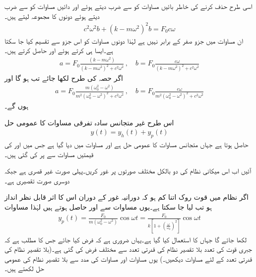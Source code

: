 اسی طرح  حذف کرنے کی خاطر بائیں مساوات کو  سے ضرب دیتے ہوئے اور دائیں مساوات کو  سے ضرب دیتے ہوئے دونوں کا مجموعہ لیتے ہیں۔
\begin{align*}
c^2\omega^2 b+(k-m\omega^2)^2b=F_0c\omega
\end{align*}
ان مساوات میں جزو  صفر کے برابر نہیں ہے لہٰذا دونوں مساوات کو اس جزو سے تقسیم کیا جا سکتا ہے۔ایسا ہی کرتے ہوئے  اور  حاصل کرتے ہیں۔
\begin{align*}
a=F_0\frac{(k-m\omega^2)}{(k-m\omega^2)^2+c^2\omega^2}\, , \quad b=F_0\frac{c\omega}{(k-m\omega^2)^2+c^2\omega^2}
\end{align*}
اگر حصہ  کی طرح  لکھا جائے تب  ہو گا اور 
\begin{align}\label{مساوات_سادہ_دو_نا_معلوم_عددی_سر_الف}
a=F_0\frac{m(\omega_0^2-\omega^2)}{m^2(\omega_0^2-\omega^2)^2+c^2\omega^2}\, , \quad b=F_0\frac{c\omega}{m^2(\omega_0^2-\omega^2)^2+c^2\omega^2}
\end{align}
ہوں گے۔

اس طرح غیر متجانس سادہ تفرقی مساوات  کا عمومی حل
\begin{align}\label{مساوات_سادہ_دو_نا_معلوم_عددی_سر_ب}
y(t)=y_h(t)+y_p(t)
\end{align}
حاصل ہوتا ہے جہاں  متجانس مساوات  کا عمومی حل ہے اور  مساوات  میں دیا گیا ہے جس میں  اور  کی قیمتیں مساوات  سے پر کی گئی ہیں۔

آئیں اب اس میکانی نظام کی دو بالکل مختلف صورتوں پر غور کریں۔پہلی صورت  غیر قصری ہے جبکہ دوسری صورت  تقصیری ہے۔

اگر نظام میں قوت روک اتنا کم ہو کہ دورانیہ غور کے دوران اس کا اثر قابل نظر انداز ہو تب  لیا جا سکتا ہے۔یوں مساوات  سے  اور  حاصل ہوتے ہیں لہٰذا مساوات 
\begin{align}\label{مساوات_سادہ_دو_بلا_تقصیر_حل_الف}
y_p(t)=\frac{F_0}{m(\omega_0^2-\omega^2)}\cos \omega t=\frac{F_0}{k[1+\left(\frac{\omega}{\omega_0}\right)^2]}\cos \omega t
\end{align}
لکھا جائے گا جہاں  کا استعمال کیا گیا ہے۔یہاں ضروری ہے کہ  فرض کیا جائے جس کا مطلب ہے کہ جبری قوت کی تعدد  بلا تقصیر نظام کی قدرتی تعدد  سے مختلف فرض کی گئی ہے۔(بلا تقصیر نظام کی قدرتی تعدد کے لئے  مساوات  دیکھیں۔) یوں مساوات   اور مساوات  کی مدد سے بلا تقصیر نظام کی عمومی حل لکھتے ہیں۔

